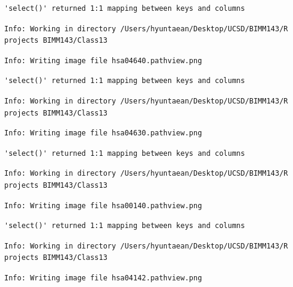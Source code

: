 \documentclass[
  letterpaper,
  DIV=11,
  numbers=noendperiod]{scrartcl}
\begin{document}
\begin{verbatim}
'select()' returned 1:1 mapping between keys and columns
\end{verbatim}

\begin{verbatim}
Info: Working in directory /Users/hyuntaean/Desktop/UCSD/BIMM143/R projects BIMM143/Class13
\end{verbatim}

\begin{verbatim}
Info: Writing image file hsa04640.pathview.png
\end{verbatim}

\begin{verbatim}
'select()' returned 1:1 mapping between keys and columns
\end{verbatim}

\begin{verbatim}
Info: Working in directory /Users/hyuntaean/Desktop/UCSD/BIMM143/R projects BIMM143/Class13
\end{verbatim}

\begin{verbatim}
Info: Writing image file hsa04630.pathview.png
\end{verbatim}

\begin{verbatim}
'select()' returned 1:1 mapping between keys and columns
\end{verbatim}

\begin{verbatim}
Info: Working in directory /Users/hyuntaean/Desktop/UCSD/BIMM143/R projects BIMM143/Class13
\end{verbatim}

\begin{verbatim}
Info: Writing image file hsa00140.pathview.png
\end{verbatim}

\begin{verbatim}
'select()' returned 1:1 mapping between keys and columns
\end{verbatim}

\begin{verbatim}
Info: Working in directory /Users/hyuntaean/Desktop/UCSD/BIMM143/R projects BIMM143/Class13
\end{verbatim}

\begin{verbatim}
Info: Writing image file hsa04142.pathview.png
\end{verbatim}
\end{document}
